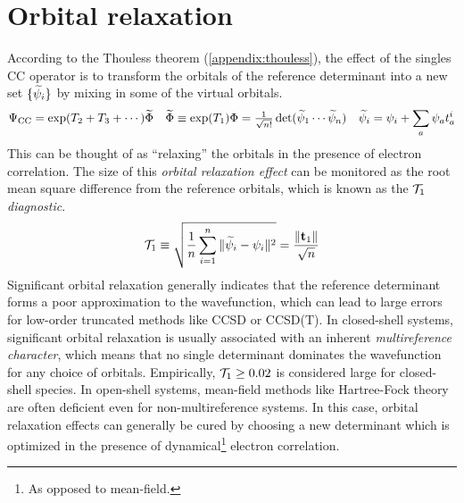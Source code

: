 \documentclass[11pt]{article}
\numberwithin{equation}{section}
\begin{document}
\setlength{\abovedisplayskip}{5pt}
\setlength{\belowdisplayskip}{5pt}


\setcounter{section}{7}
\section{Orbital relaxation}


\begin{rmk}
According to the Thouless theorem (\cref{appendix:thouless}), the effect of the singles CC operator is to transform the orbitals of the reference determinant into a new set $\{\widetilde{\psi }_i\}$ by mixing in some of the virtual orbitals.
\begin{align}
  \Psi _{\mathrm{CC}}
=
  \mathrm{exp}(T_2 + T_3 + \cdots)
  \widetilde{\Phi }
&&
  \widetilde{\Phi }
\equiv
  \mathrm{exp}(T_1)
  \Phi 
=
  \tfrac{1}{\sqrt{n!}}\,
  \mathrm{det}(\widetilde{\psi }_1\cdots \widetilde{\psi }_n)
&&
  \widetilde{\psi }_i
=
  \psi _i
+
  \sum_a
  \psi _a
  t_a^i
\end{align}
This can be thought of as ``relaxing'' the orbitals in the presence of electron correlation.
The size of this \textit{orbital relaxation effect} can be monitored as the root mean square difference from the reference orbitals, which is known as the \textit{$\mathcal{T}_1$ diagnostic}.
\begin{align}
  \mathcal{T}_1
\equiv
  \sqrt{
  \frac {1}{n}
  \sum_{i=1}^n
  \|\widetilde{\psi }_i - \psi _i\|^2
  }
=
  \frac {\|\mathbf{t}_1\|}{\sqrt{n}}
\end{align}
Significant orbital relaxation generally indicates that the reference determinant forms a poor approximation to the wavefunction, which can lead to large errors for low-order truncated methods like CCSD or CCSD(T).
In closed-shell systems, significant orbital relaxation is usually associated with an inherent \textit{multireference character}, which means that no single determinant dominates the wavefunction for any choice of orbitals.
Empirically, $\mathcal{T}_1\geq 0.02$ is considered large for closed-shell species.
In open-shell systems, mean-field methods like Hartree-Fock theory are often deficient even for non-multireference systems.
In this case, orbital relaxation effects can generally be cured by choosing a new determinant which is optimized in the presence of dynamical\footnote{As opposed to mean-field.} electron correlation.
\end{rmk}
\end{document}
